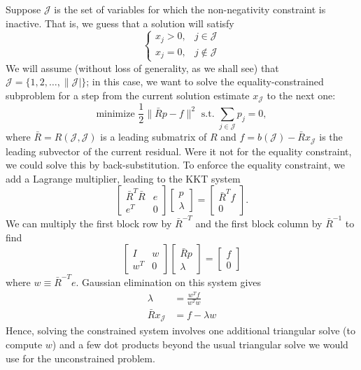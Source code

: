 \documentclass[12pt, leqno]{article} %
\begin{document}
Suppose $\mathcal{J}$ is the set of variables for which the
non-negativity constraint is inactive.  That is, we guess
that a solution will satisfy
\[
\begin{cases}
  x_j > 0, & j \in \mathcal{J} \\
  x_j = 0, & j \not \in \mathcal{J}
\end{cases}
\]
We will assume (without loss of generality, as we shall see) that
$\mathcal{J} = \{ 1, 2, \ldots, \|\mathcal{J}|\}$; in this case,
we want to solve the equality-constrained subproblem for a step
from the current solution estimate $x_{\mathcal{J}}$ to the next one:
\[
  \mbox{minimize } \frac{1}{2} \|\bar{R} p - f\|^2
  \mbox{ s.t.~} \sum_{j \in \mathcal{J}} p_j = 0,
\]
where $\bar{R} = R(\mathcal{J}, \mathcal{J})$ is a leading submatrix
of $R$ and $f = b(\mathcal{J})-\bar{R} x_{\mathcal{J}}$ is the leading
subvector of the current residual.
Were it not for the equality constraint, we could solve
this by back-substitution.  To enforce the equality constraint, we
add a Lagrange multiplier, leading to the KKT system
\[
\begin{bmatrix}
  \bar{R}^T \bar{R} & e \\
  e^T & 0
\end{bmatrix}
\begin{bmatrix}
  p \\ \lambda
\end{bmatrix} =
\begin{bmatrix}
  \bar{R}^T f \\ 0
\end{bmatrix}.
\]
We can multiply the first block row by $\bar{R}^{-T}$ and the first block
column by $\bar{R}^{-1}$ to find
\[
\begin{bmatrix}
  I & w \\
  w^T & 0
\end{bmatrix}
\begin{bmatrix}
  \bar{R} p \\ \lambda
\end{bmatrix} =
\begin{bmatrix}
  f \\ 0
\end{bmatrix}
\]
where $w \equiv \bar{R}^{-T} e$.  Gaussian elimination on this system
gives
\begin{align*}
  \lambda &= \frac{w^T f}{w^T w} \\
  \bar{R} x_{\mathcal{J}} &= f-\lambda w
\end{align*}
Hence, solving the constrained system involves one additional
triangular solve (to compute $w$) and a few dot products beyond
the usual triangular solve we would use for the unconstrained problem.
\end{document}

